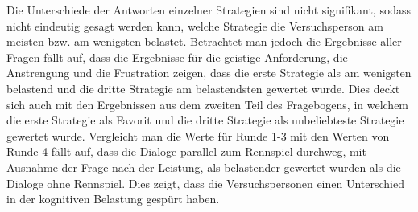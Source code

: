 \documentclass[12pt,a4paper]{scrartcl}
\begin{document}
Die Unterschiede der Antworten einzelner Strategien sind nicht signifikant, sodass nicht eindeutig gesagt werden kann, welche Strategie die Versuchsperson am meisten bzw. am wenigsten belastet. Betrachtet man jedoch die Ergebnisse aller Fragen fällt auf, dass die Ergebnisse für die geistige Anforderung, die Anstrengung und die Frustration zeigen, dass die erste Strategie als am wenigsten belastend und die dritte Strategie am belastendsten gewertet wurde. Dies deckt sich auch mit den Ergebnissen aus dem zweiten Teil des Fragebogens, in welchem die erste Strategie als Favorit und die dritte Strategie als unbeliebteste Strategie gewertet wurde. \newline \newline Vergleicht man die Werte für Runde 1-3 mit den Werten von Runde 4 fällt auf, dass die Dialoge parallel zum Rennspiel durchweg, mit Ausnahme der Frage nach der Leistung, als belastender gewertet wurden als die Dialoge ohne Rennspiel. Dies zeigt, dass die Versuchspersonen einen Unterschied in der kognitiven Belastung gespürt haben.   
\end{document}
